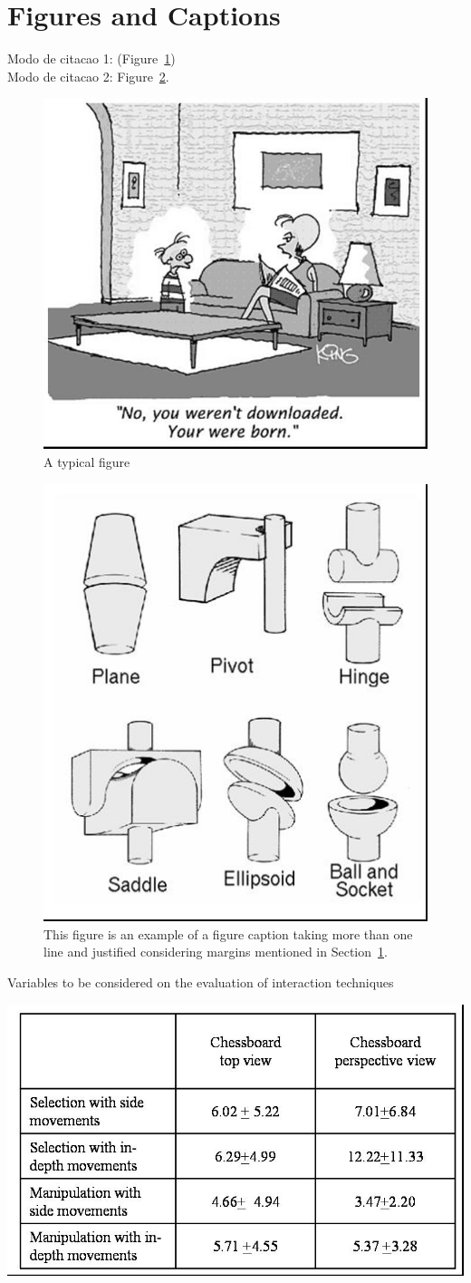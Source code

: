 \documentclass[12pt]{article}
\begin{document}
\section{Figures and Captions}\label{sec:figs}

Modo de citacao 1:
(Figure~\ref{fig:exampleFig1})\\
Modo de citacao 2:
 Figure~\ref{fig:exampleFig2}.
 
\begin{figure}[ht]
\centering
\includegraphics[width=.5\textwidth]{fig1.jpg}
\caption{A typical figure}
\label{fig:exampleFig1}
\end{figure}

\begin{figure}[ht]
\centering
\includegraphics[width=.3\textwidth]{fig2.jpg}
\caption{This figure is an example of a figure caption taking more than one
  line and justified considering margins mentioned in Section~\ref{sec:figs}.}
\label{fig:exampleFig2}
\end{figure}

\begin{table}[ht]
\centering
\caption{Variables to be considered on the evaluation of interaction
  techniques}
\label{tab:exTable1}
\includegraphics[width=.7\textwidth]{table.jpg}
\end{table}




\end{document}
